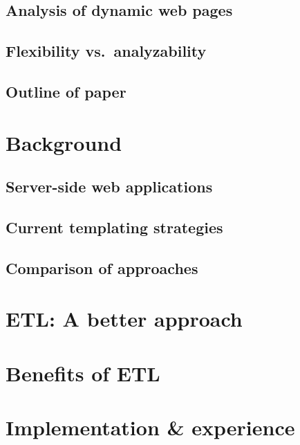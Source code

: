 \documentclass{www2003-submission}
\begin{document}
\subsection{Analysis of dynamic web pages}

\subsection{Flexibility vs.\ analyzability}

\subsection{Outline of paper}


\section{Background}

\subsection{Server-side web applications}

\subsection{Current templating strategies}

\subsection{Comparison of approaches}



\section{ETL: A better approach}


\section{Benefits of ETL}

\section{Implementation \& experience}
\end{document}
